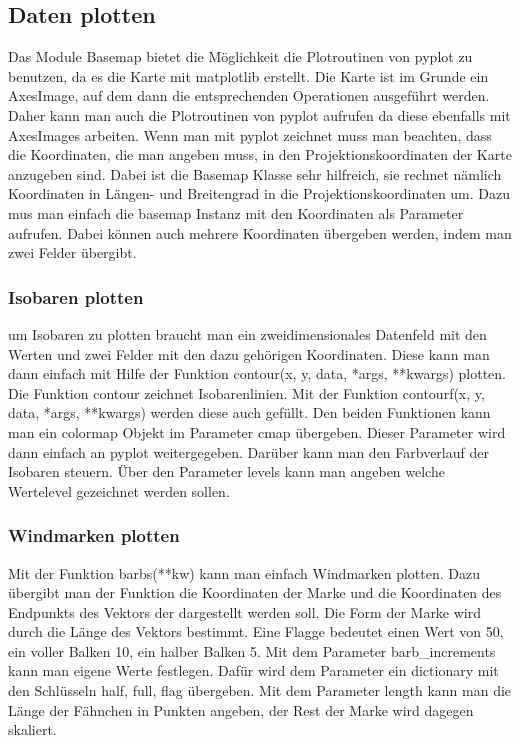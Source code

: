 \subsection{Daten plotten}
\label{sec:potdata}
Das Module \textsf{Basemap} bietet die Möglichkeit die Plotroutinen von \textsf{pyplot} zu benutzen, da es die Karte mit \textsf{matplotlib} erstellt. Die Karte ist im Grunde ein \textsf{AxesImage}, auf dem dann die entsprechenden Operationen ausgeführt werden. Daher kann man auch die Plotroutinen von \textsf{pyplot} aufrufen da diese ebenfalls mit \textsf{AxesImages} arbeiten. Wenn man mit \textsf{pyplot} zeichnet muss man beachten, dass die Koordinaten, die man angeben muss, in den Projektionskoordinaten der Karte anzugeben sind. Dabei ist die \textsf{Basemap} Klasse sehr hilfreich, sie rechnet nämlich Koordinaten in Längen- und Breitengrad in die Projektionskoordinaten um. Dazu mus man einfach die \textsf{basemap} Instanz mit den Koordinaten als Parameter aufrufen. Dabei können auch mehrere Koordinaten übergeben werden, indem man zwei Felder übergibt.\\
\subsubsection{Isobaren plotten}
um Isobaren zu plotten braucht man ein zweidimensionales Datenfeld mit den Werten und zwei Felder mit den dazu gehörigen Koordinaten. Diese kann man dann einfach mit Hilfe der Funktion \textsf{contour(x, y, data, *args, **kwargs)} plotten. Die Funktion \textsf{contour} zeichnet Isobarenlinien. Mit der Funktion \textsf{contourf(x, y, data, *args, **kwargs)} werden diese auch gefüllt. Den beiden Funktionen kann man ein \textsf{colormap} Objekt im Parameter \textsf{cmap} übergeben. Dieser Parameter wird dann einfach an \textsf{pyplot} weitergegeben. Darüber kann man den Farbverlauf der Isobaren steuern. Über den Parameter \textsf{levels} kann man angeben welche Wertelevel gezeichnet werden sollen.\\
\subsubsection{Windmarken plotten}
Mit der Funktion \textsf{barbs(**kw)} kann man einfach Windmarken plotten. Dazu übergibt man der Funktion die Koordinaten der Marke und die Koordinaten des Endpunkts des Vektors der dargestellt werden soll. Die Form der Marke wird durch die Länge des Vektors bestimmt. Eine Flagge bedeutet einen Wert von 50, ein voller Balken 10, ein halber Balken 5. Mit dem Parameter \textsf{barb\_increments} kann man eigene Werte festlegen. Dafür wird dem Parameter ein \textsf{dictionary} mit den \textsf{Schlüsseln} \textsf{half, full, flag} übergeben. Mit dem Parameter \textsf{length} kann man die Länge der Fähnchen in Punkten angeben, der Rest der Marke wird dagegen skaliert.\\
